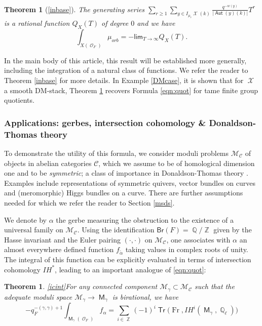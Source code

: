 \documentclass{article}
\DeclareMathOperator{\Xc}{\mathcal{X}}
\DeclareMathOperator{\Oc}{\mathcal{O}}
\newcommand{\Cc}{\mathcal{C}}
\renewcommand{\lim}{\mathsf{lim}}
\DeclareMathOperator{\Zb}{\mathbb{Z}}
\DeclareMathOperator{\Aut}{\mathsf{Aut}}
\DeclareMathOperator{\M}{{\mathsf{M}}}
\newcommand{\Mc}{\mathcal{M}}
\DeclareMathOperator{\Tr}{\mathsf{Tr}}
\DeclareMathOperator{\Fr}{Fr}
\DeclareMathOperator{\Qb}{\mathbb{Q}}
\newcommand{\CM}{{\mathcal M}}
\theoremstyle{definition}
\theoremstyle{plain}
\newtheorem{theorem}[definition]{Theorem}
\begin{document}
\begin{theorem}[\ref{inbase}]\label{inthm} The generating series $\sum_{r\geq 1} \sum_{y \in I_{\mu_r}\Xc(k)} \frac{q^{-w(y)}}{|\Aut(y)(k)|}T^r$ is a rational function $Q_X(T)$ of degree $0$ and we have
\begin{equation}\label{introeq}
\int_{X(\Oc_F)} \mu_{orb} = -\lim_{T\to \infty} Q_X(T).
\end{equation}
\end{theorem}

In the main body of this article, this result will be established more generally, including the integration of a natural class of functions. We refer the reader to Theorem \ref{inbase} for more details. In Example \ref{DMcase}, it is shown that for $\Xc$ a smooth DM-stack, Theorem \ref{inthm} recovers Formula \eqref{eqn:quot} for tame finite group quotients.

\subsubsection*{Applications: gerbes, intersection cohomology \& Donaldson-Thomas theory}

To demonstrate the utility of this formula, we consider moduli problems $\Mc_{\Cc}$ of objects in abelian categories $\Cc$, which we assume to be of homological dimension one and to be \emph{symmetric}; a class of importance in Donaldson-Thomas theory \cite{MR19,Me15,BDNKP25}. Examples include representations of symmetric quivers, vector bundles on curves and (meromorphic) Higgs bundles on a curve. There are further assumptions needed for which we refer the reader to Section \ref{msds}.

We denote by $\alpha$ the gerbe measuring the obstruction to the existence of a universal family on $\Mc_{\Cc}$. Using the identification $\mathsf{Br}(F) = \Qb/\Zb$ given by the Hasse invariant and the Euler pairing $(\cdot,\cdot)$ on $\CM_{\Cc}$, one associates with $\alpha$ an almost everywhere defined function $f_{\tilde{\alpha}}$ taking values in complex roots of unity. The integral of this function can be explicitly evaluated in terms of intersection cohomology $IH^*$, leading to an important analogue of \eqref{eqn:quot}:

\begin{theorem}\eqref{icint}\label{thm:main2}
For any connected component $\CM_{\gamma}\subset \CM_{\Cc}$ such that the adequate moduli space $\CM_{\gamma} \to \M_\gamma$ is birational, we have
\[
- q_F^{-(\gamma,\gamma)+1} \int_{\M_{\gamma}(\Oc_F)} f_\alpha = \sum_{i \in \Zb} (-1)^i \Tr\big( \Fr, IH^i(\M_{\gamma},\Qb_{\ell})\big )
\]
\end{theorem}
\end{document}
